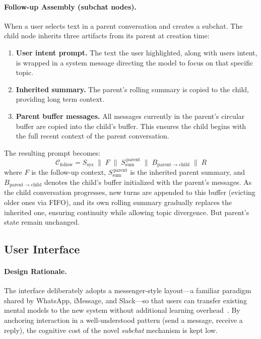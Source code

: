 \documentclass[pdflatex,sn-mathphys-num]{sn-jnl}%
\theoremstyle{thmstyleone}%
\theoremstyle{thmstyletwo}%
\theoremstyle{thmstylethree}%
\begin{document}
\paragraph{Follow-up Assembly (subchat nodes).}
When a user selects text in a parent conversation and creates a subchat. The child node inherits three artifacts from its parent at creation time:
\begin{enumerate}
    \item \textbf{User intent prompt.} The text the user highlighted, along with users intent, is wrapped in a system message directing the model to focus on that specific topic.
    \item \textbf{Inherited summary.} The parent's rolling summary is copied to the child, providing long term context.
    \item \textbf{Parent buffer messages.} All messages currently in the parent's circular buffer are copied into the child's buffer. This ensures the child begins with the full recent context of the parent conversation.
\end{enumerate}
The resulting prompt becomes:
\begin{equation}
\mathcal{C}_{\mathrm{follow}} = S_{\mathrm{sys}} \;\|\; F \;\|\; S_{\mathrm{sum}}^{\,\mathrm{parent}} \;\|\; B_{\mathrm{parent} \to \mathrm{child}} \;\|\; R
\label{eq:context_followup}
\end{equation}
where $F$ is the follow-up context, $S_{\mathrm{sum}}^{\,\mathrm{parent}}$ is the inherited parent summary, and $B_{\mathrm{parent} \to \mathrm{child}}$ denotes the child's buffer initialized with the parent's messages. As the child conversation progresses, new turns are appended to this buffer (evicting older ones via FIFO), and its own rolling summary gradually replaces the inherited one, ensuring continuity while allowing topic divergence. But parent's state remain unchanged.

\subsection{User Interface}\label{subsec:ui}

\paragraph{Design Rationale.}
The interface deliberately adopts a messenger-style layout---a familiar paradigm shared by WhatsApp, iMessage, and Slack---so that users can transfer existing mental models to the new system without additional learning overhead~\cite{nielsen1994usability}. By anchoring interaction in a well-understood pattern (send a message, receive a reply), the cognitive cost of the novel \emph{subchat} mechanism is kept low.
\end{document}
